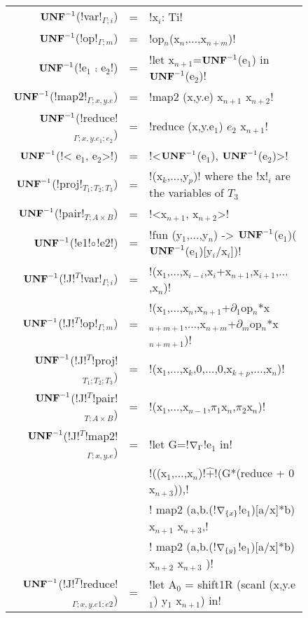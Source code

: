 \begin{figure*}[t]
    \begin{tabular}{|r c l|}
    \hline
    $\mathbf{UNF}^{-1}$(!var!$_{\Gamma;i}$) &=& !x$_i$: Ti! \\
    $\mathbf{UNF}^{-1}$(!op!$_{\Gamma;m}$) &=& !op$_n$(x$_n$,$\ldots$,x$_{n+m}$)! \\
    $\mathbf{UNF}^{-1}$(!e$_1$ $\comp$ e$_2$!) &=& !let x$_{n+1}$=$\mathbf{UNF}^{-1}$(e$_1$) in $\mathbf{UNF}^{-1}$(e$_2$)! \\
    $\mathbf{UNF}^{-1}$(!map2!$_{\Gamma;x,y.e}$) &=& !map2 (x,y.e) x$_{n+1}$ x$_{n+2}$! \\
    $\mathbf{UNF}^{-1}$(!reduce!$_{\Gamma;x,y.e_1;e_2}$) &=& !reduce (x,y.e$_1$) $e_2$ x$_{n+1}$! \\
    $\mathbf{UNF}^{-1}$(!< e$_1$, e$_2$>!) &=& !<$\mathbf{UNF}^{-1}$(e$_1$), $\mathbf{UNF}^{-1}$(e$_2$)>! \\
    $\mathbf{UNF}^{-1}$(!proj!$_{T_1;T_2;T_3}$) &=& !(x$_{k}$,$\ldots$,y$_{p}$)! where the !x!$_{i}$ are the variables of $T_3$ \\
    $\mathbf{UNF}^{-1}$(!pair!$_{T;A\times B}$) &=& !<x$_{n+1}$, x$_{n+2}$>! \\
    $\mathbf{UNF}^{-1}$(!e1!$\circ$!e2!) &=& !fun (y$_1$,$\ldots$,y$_n$) -> $\mathbf{UNF}^{-1}$(e$_1$)($\mathbf{UNF}^{-1}$(e$_1$)[y$_i$/x$_i$])! \\
    $\mathbf{UNF}^{-1}$(!J!$^T$!var!$_{\Gamma;i}$) &=& !(x$_1$,$\ldots$,x$_{i-i}$,x$_i$+x$_{n+1}$,x$_{i+1}$,$\ldots$,x$_{n}$)! \\
    $\mathbf{UNF}^{-1}$(!J!$^T$!op!$_{\Gamma;m}$) &=& !(x$_1$,$\ldots$,x$_{n}$,x$_{n+1}$+$\partial_1$op$_n$*x$_{n+m+1}$,$\ldots$,x$_{n+m}$+$\partial_m$op$_n$*x$_{n+m+1}$)! \\
    $\mathbf{UNF}^{-1}$(!J!$^T$!proj!$_{T_1;T_2;T_3}$) &=& !(x$_1$,$\ldots$,x$_k$,0,$\ldots$,0,x$_{k+p}$,$\ldots$,x$_n$)! \\
    $\mathbf{UNF}^{-1}$(!J!$^T$!pair!$_{T;A\times B}$) &=& !(x$_1$,$\ldots$,x$_{n-1}$,$\pi_1$x$_n$,$\pi_2$x$_n$)! \\
    $\mathbf{UNF}^{-1}$(!J!$^T$!map2!$_{\Gamma;x,y.e}$) &=& 
    !let G=!$\nabla_{\Gamma}$!e$_{1}$ in!\\
    && !((x$_{1}$,$\ldots$,x$_n$)!$\widehat{+}$!(G*(reduce + 0 x$_{n+3}$)),!\\
    && ! map2 (a,b.(!$\nabla_{\{x\}}$!e$_{1}$)[a/x]*b) x$_{n+1}$ x$_{n+3}$,!\\
    && ! map2 (a,b.(!$\nabla_{\{y\}}$!e$_{1}$)[a/x]*b) x$_{n+2}$ x$_{n+3}$ )!\\
    $\mathbf{UNF}^{-1}$(!J!$^T$!reduce!$_{\Gamma;x,y.e1;e2}$) &=& !let A$_{0}$ = shift1R (scanl (x,y.e$_{1}$) y$_{1}$ x$_{n+1}$) in! \\

\end{tabular}
\end{figure*}
